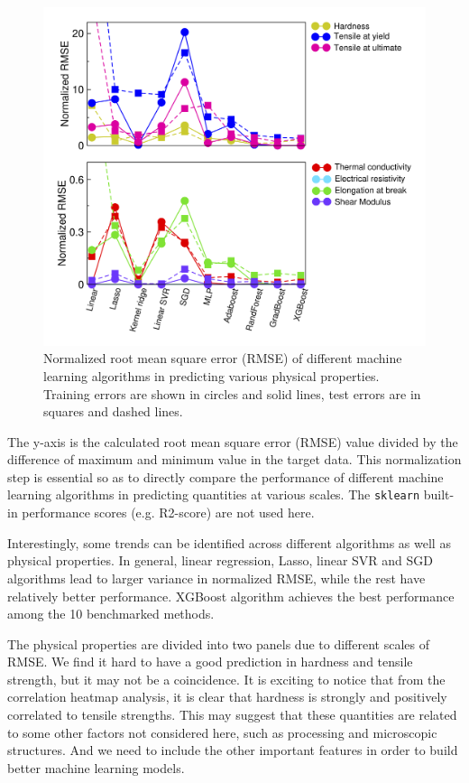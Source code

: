 \documentclass[10pt,aps,prb,amsmath,amssymb,twocolumn,letterpaper,nobalancelastpage,final,citeautoscript,floatfix,raggedbottom,superscriptaddress]{revtex4-1}
\begin{document}
\begin{figure}[h]
  \center
 \includegraphics[width=0.95\linewidth]{figures/benchmark.png}
 \vspace{-10pt}
  \caption{Normalized root mean square error (RMSE) of different machine learning algorithms in predicting various physical properties. Training errors are shown in circles and solid lines, test errors are in squares and dashed lines.}
  \label{fig:benchmark}
\end{figure}


The y-axis is the calculated root mean square error (RMSE) value divided by the difference of maximum and minimum value in the target data. This normalization step is essential so as to directly compare the performance of different machine learning algorithms in predicting quantities at various scales. The \texttt{sklearn} built-in performance scores (e.g. R2-score) are not used here.

Interestingly, some trends can be identified across different algorithms as well as physical properties. In general, linear regression, Lasso, linear SVR and SGD algorithms lead to larger variance in normalized RMSE, while the rest have relatively better performance. XGBoost algorithm achieves the best performance among the 10 benchmarked methods.

The physical properties are divided into two panels due to different scales of RMSE. We find it hard to have a good prediction in hardness and tensile strength, but it may not be a coincidence. It is exciting to notice that from the correlation heatmap analysis, it is clear that hardness is strongly and positively correlated to tensile strengths. This may suggest that these quantities are related to some other factors not considered here, such as processing and microscopic structures. And we need to include the other important features in order to build better machine learning models.
\end{document}
